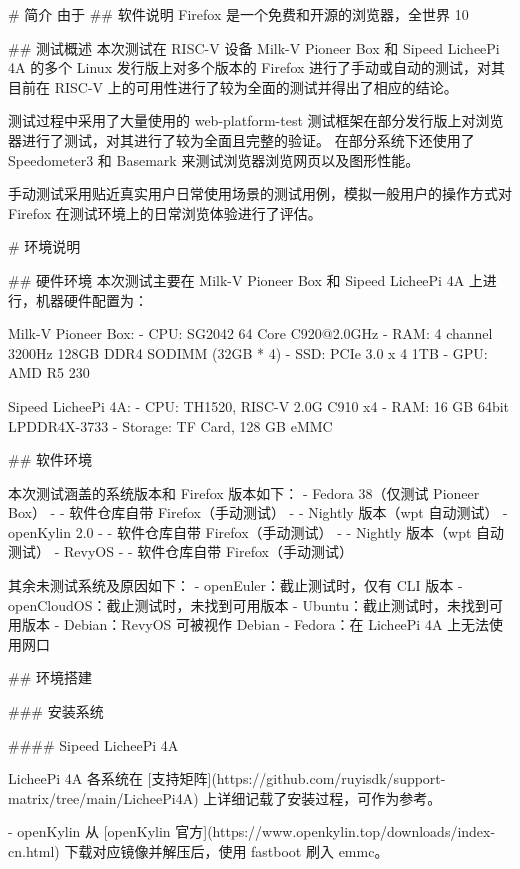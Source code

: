 \documentclass{article}
\begin{document}
\begin{markdown}

# 简介
由于
## 软件说明
Firefox 是一个免费和开源的浏览器，全世界 10%

## 测试概述
本次测试在 RISC-V 设备 Milk-V Pioneer Box 和 Sipeed LicheePi 4A 的多个 Linux 发行版上对多个版本的 Firefox 进行了手动或自动的测试，对其目前在 RISC-V 上的可用性进行了较为全面的测试并得出了相应的结论。

测试过程中采用了大量使用的 web-platform-test 测试框架在部分发行版上对浏览器进行了测试，对其进行了较为全面且完整的验证。
在部分系统下还使用了 Speedometer3 和 Basemark 来测试浏览器浏览网页以及图形性能。

手动测试采用贴近真实用户日常使用场景的测试用例，模拟一般用户的操作方式对 Firefox 在测试环境上的日常浏览体验进行了评估。

# 环境说明

## 硬件环境
本次测试主要在 Milk-V Pioneer Box 和 Sipeed LicheePi 4A 上进行，机器硬件配置为：

Milk-V Pioneer Box:
- CPU: SG2042 64 Core C920@2.0GHz
- RAM: 4 channel 3200Hz 128GB DDR4 SODIMM (32GB * 4)
- SSD: PCIe 3.0 x 4 1TB
- GPU: AMD R5 230

Sipeed LicheePi 4A:
- CPU: TH1520, RISC-V 2.0G C910 x4
- RAM: 16 GB 64bit LPDDR4X-3733
- Storage: TF Card, 128 GB eMMC

## 软件环境

本次测试涵盖的系统版本和 Firefox 版本如下：
- Fedora 38（仅测试 Pioneer Box）
- - 软件仓库自带 Firefox（手动测试）
- - Nightly 版本（wpt 自动测试）
- openKylin 2.0
- - 软件仓库自带 Firefox（手动测试）
- - Nightly 版本（wpt 自动测试）
- RevyOS
- - 软件仓库自带 Firefox（手动测试）

其余未测试系统及原因如下：
- openEuler：截止测试时，仅有 CLI 版本
- openCloudOS：截止测试时，未找到可用版本
- Ubuntu：截止测试时，未找到可用版本
- Debian：RevyOS 可被视作 Debian
- Fedora：在 LicheePi 4A 上无法使用网口

## 环境搭建


### 安装系统

#### Sipeed LicheePi 4A

LicheePi 4A 各系统在 [支持矩阵](https://github.com/ruyisdk/support-matrix/tree/main/LicheePi4A) 上详细记载了安装过程，可作为参考。

- openKylin
从 [openKylin 官方](https://www.openkylin.top/downloads/index-cn.html) 下载对应镜像并解压后，使用 fastboot 刷入 emmc。


\end{markdown}
\end{document}
